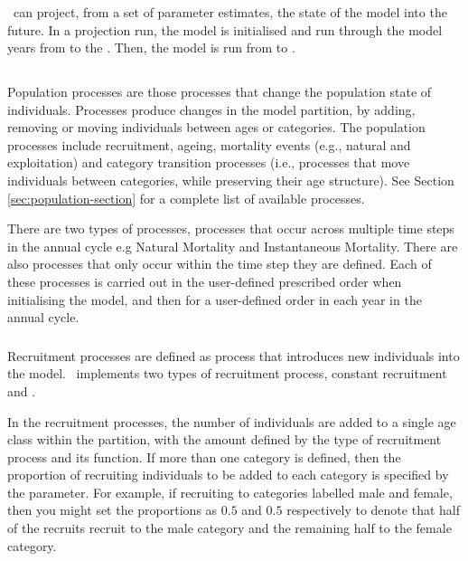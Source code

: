 \subsubsection{\label{sec:projections}}

\CNAME\ can project, from a set of parameter estimates, the state of the model into the future. In a projection run, the model is initialised and run through the model years from  to the . Then, the model is run from  to . 


\subsection{}
\CH
Population processes are those processes that change the population state of individuals. Processes produce changes in the model partition, by adding, removing or moving individuals between ages or categories. The population processes include recruitment, ageing,  mortality events (e.g., natural and exploitation) and category transition processes (i.e., processes that move individuals between categories, while preserving their age structure). See Section \ref{sec:population-section} for a complete list of available processes.

There are two types of processes, processes that occur across multiple time steps in the annual cycle e.g Natural Mortality and Instantaneous Mortality. There are also processes that only occur within the time step they are defined. Each of these processes is carried out in the user-defined prescribed order when initialising the model, and then for a user-defined order in each year in the annual cycle. 

\subsubsection{}
\CH
Recruitment processes are defined as  process that introduces new individuals into the model. \CNAME\ implements two types of recruitment process, constant recruitment and   \citep{1203}.

In the recruitment processes, the number of individuals are added to a single age class within the partition, with the amount defined by the type of recruitment process and its function. If more than one category is defined, then the proportion of recruiting individuals to be added to each category is specified by the  parameter. For example, if recruiting to categories labelled male and female, then you might set the proportions as $0.5$ and $0.5$ respectively to denote that half of the recruits recruit to the male category and the remaining half to the female category.

